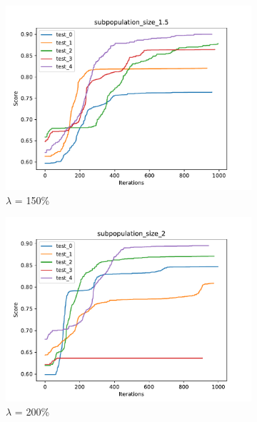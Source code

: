 \begin{figure}[H]
\begin{subfigure}[b]{0.49\linewidth}
        \includegraphics[width=\linewidth]{img/subpopulation_size_1.5.pdf}
        \caption{$\lambda$ = 150\%}
    \end{subfigure}
    \begin{subfigure}[b]{0.49\linewidth}
        \includegraphics[width=\linewidth]{img/subpopulation_size_2.pdf}
        \caption{$\lambda$ = 200\%}
    \end{subfigure}
    \begin{subfigure}[b]{0.49\linewidth}

\end{subfigure}
\end{figure}
